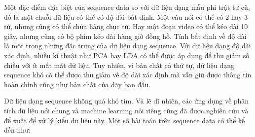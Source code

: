 Một đặc điểm đặc biệt của sequence data so với dữ liệu dạng mẫu phi trật tự cũ, đó là một chuỗi dữ liệu có thể có độ dài bất định. Một câu nói có thể có 2 hay 3 từ, nhưng cũng có thể chứa hàng chục từ. Hay một đoạn video có thể kéo dài 10 giây, nhưng cũng có bộ phim kéo dài hàng giờ đồng hồ. Tính bất định về độ dài là một trong những đặc trưng của dữ liệu dạng sequence. Với dữ liệu dạng độ dài xác định, nhiều kĩ thuật như PCA hay LDA có thể được áp dụng để thu giảm số chiều với ít mất mát dữ liệu. Tuy nhiên, vì bản chất có thứ tự, dữ liệu dạng sequence khó có thể được thu giảm về độ dài xác định mà vẫn giữ được thông tin hoàn chỉnh cũng như bản chất của dãy ban đầu.

Dữ liệu dạng sequence không quá khó tìm. Và lẽ dĩ nhiên, các ứng dụng về phân tích dữ liệu nói chung và machine learning nói riêng cũng đã được nghiên cứu và để xuất để xử lý kiểu dữ liệu này. Một số bài toán trên sequence data có thể kể đến như:
